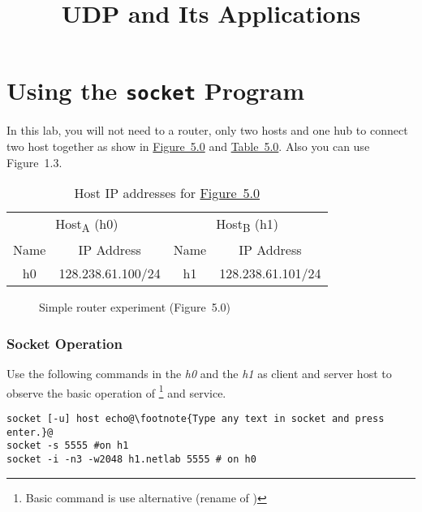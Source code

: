 \documentclass{../UTNetLab}
\title{UDP and Its Applications}
\begin{document}
\part{Using the \texttt{socket} Program}
\label{sec:schema}
In this lab, you will not need to a router, only two hosts and one hub to connect two host together as show in \hyperref[fig:5.0]{Figure~5.0} and \hyperref[tab:5.0]{Table~5.0}.
Also you can use Figure~1.3.
\begin{table}[H]
    \caption{Host IP addresses for \hyperref[fig:5.0]{Figure~5.0}}
    \label{tab:5.0}
    \centering
    \begin{tabular}{ *2c|*2c }
        \hline \hline
        \multicolumn{2}{c|}{Host\textsubscript{A} (h0)} & \multicolumn{2}{c}{Host\textsubscript{B} (h1)}                            \\
        Name                                            & IP Address                                     & Name & IP Address        \\
        \hline
        h0                                              & 128.238.61.100/24                              & h1   & 128.238.61.101/24 \\
        \hline \hline
    \end{tabular}
\end{table}

\begin{figure}[H]
    \centering
    \caption{Simple router experiment (Figure~5.0)}
    \label{fig:5.0}
\end{figure}

\section{Socket Operation}
Use the following commands in the \textit{h0} and the \textit{h1} as client and server host to observe the basic operation of \footnote{Basic command is  use alternative  (rename of )} and  service.
\begin{lstlisting}[emph={host, h1,netlab},morekeywords={[3]echo}]
socket [-u] host echo@\footnote{Type any text in socket and press enter.}@
socket -s 5555 #on h1
socket -i -n3 -w2048 h1.netlab 5555 # on h0
    \end{lstlisting}
\end{document}

